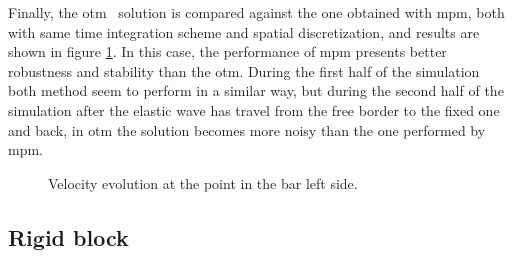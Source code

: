 \documentclass[preprint,12pt,a4paper]{elsarticle}
\begin{document}
Finally, the \acrshort{otm}~\cite{Li2010} solution is compared against the one obtained with \acrshort{mpm}, both with same time integration scheme and spatial discretization, and results are shown in figure \ref{fig:Dyka-OTM-MPM}. In
this case, the performance of \acrshort{mpm} presents better robustness and stability than the
\acrshort{otm}. During the first half of the simulation both method 
seem to perform in a similar way, but during the second half of the
simulation after the elastic wave has travel from the free border to
the fixed one and back, in \acrshort{otm} the solution becomes more noisy than the
one performed by \acrshort{mpm}.  
\begin{figure}\sidecaption
  \centering
  \caption{Velocity evolution at the point in the bar left side.}
  \label{fig:Dyka-OTM-MPM}
\end{figure}

\clearpage
\subsection{Rigid block}
\label{sec:andersen-block}
\end{document}
